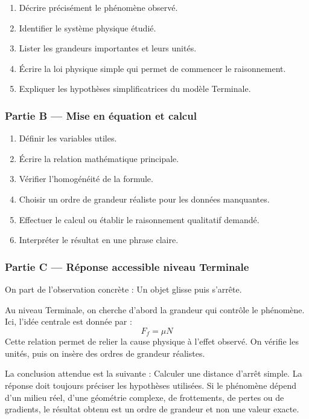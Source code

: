 \documentclass[11pt,a4paper]{article}
\begin{document}
\begin{enumerate}
  \item Décrire précisément le phénomène observé.
  \item Identifier le système physique étudié.
  \item Lister les grandeurs importantes et leurs unités.
  \item Écrire la loi physique simple qui permet de commencer le raisonnement.
  \item Expliquer les hypothèses simplificatrices du modèle Terminale.
\end{enumerate}

\subsubsection*{Partie B — Mise en équation et calcul}

\begin{enumerate}
  \item Définir les variables utiles.
  \item Écrire la relation mathématique principale.
  \item Vérifier l'homogénéité de la formule.
  \item Choisir un ordre de grandeur réaliste pour les données manquantes.
  \item Effectuer le calcul ou établir le raisonnement qualitatif demandé.
  \item Interpréter le résultat en une phrase claire.
\end{enumerate}

\subsubsection*{Partie C — Réponse accessible niveau Terminale}

\begin{corrigebox}
On part de l'observation concrète : Un objet glisse puis s'arrête.

Au niveau Terminale, on cherche d'abord la grandeur qui contrôle le phénomène. Ici, l'idée centrale est donnée par :
\[
F_f=\mu N
\]
Cette relation permet de relier la cause physique à l'effet observé. On vérifie les unités, puis on insère des ordres de grandeur réalistes.

La conclusion attendue est la suivante : Calculer une distance d'arrêt simple. La réponse doit toujours préciser les hypothèses utilisées. Si le phénomène dépend d'un milieu réel, d'une géométrie complexe, de frottements, de pertes ou de gradients, le résultat obtenu est un ordre de grandeur et non une valeur exacte.
\end{corrigebox}
\end{document}
